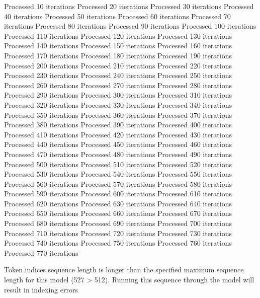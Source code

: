 \begin{pyprint}
Processed 10 iterations
Processed 20 iterations
Processed 30 iterations
Processed 40 iterations
Processed 50 iterations
Processed 60 iterations
Processed 70 iterations
Processed 80 iterations
Processed 90 iterations
Processed 100 iterations
Processed 110 iterations
Processed 120 iterations
Processed 130 iterations
Processed 140 iterations
Processed 150 iterations
Processed 160 iterations
Processed 170 iterations
Processed 180 iterations
Processed 190 iterations
Processed 200 iterations
Processed 210 iterations
Processed 220 iterations
Processed 230 iterations
Processed 240 iterations
Processed 250 iterations
Processed 260 iterations
Processed 270 iterations
Processed 280 iterations
Processed 290 iterations
Processed 300 iterations
Processed 310 iterations
Processed 320 iterations
Processed 330 iterations
Processed 340 iterations
Processed 350 iterations
Processed 360 iterations
Processed 370 iterations
Processed 380 iterations
Processed 390 iterations
Processed 400 iterations
Processed 410 iterations
Processed 420 iterations
Processed 430 iterations
Processed 440 iterations
Processed 450 iterations
Processed 460 iterations
Processed 470 iterations
Processed 480 iterations
Processed 490 iterations
Processed 500 iterations
Processed 510 iterations
Processed 520 iterations
Processed 530 iterations
Processed 540 iterations
Processed 550 iterations
Processed 560 iterations
Processed 570 iterations
Processed 580 iterations
Processed 590 iterations
Processed 600 iterations
Processed 610 iterations
Processed 620 iterations
Processed 630 iterations
Processed 640 iterations
Processed 650 iterations
Processed 660 iterations
Processed 670 iterations
Processed 680 iterations
Processed 690 iterations
Processed 700 iterations
Processed 710 iterations
Processed 720 iterations
Processed 730 iterations
Processed 740 iterations
Processed 750 iterations
Processed 760 iterations
Processed 770 iterations
\end{pyprint}

\begin{pyprint}
Token indices sequence length is longer than the specified maximum sequence length for this model (527 > 512). Running this sequence through the model will result in indexing errors
\end{pyprint}

